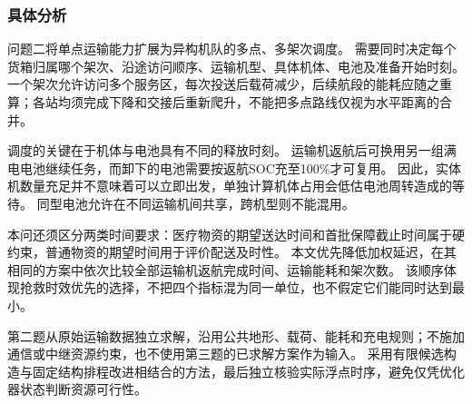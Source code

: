\subsubsection{具体分析}
\label{sec:q2:analysis}

问题二将单点运输能力扩展为异构机队的多点、多架次调度。
需要同时决定每个货箱归属哪个架次、沿途访问顺序、运输机型、具体机体、电池及准备开始时刻。
一个架次允许访问多个服务区，每次投送后载荷减少，后续航段的能耗应随之重算；各站均须完成下降和交接后重新爬升，不能把多点路线仅视为水平距离的合并。

调度的关键在于机体与电池具有不同的释放时刻。
运输机返航后可换用另一组满电电池继续任务，而卸下的电池需要按返航SOC充至100\%才可复用。
因此，实体机数量充足并不意味着可以立即出发，单独计算机体占用会低估电池周转造成的等待。
同型电池允许在不同运输机间共享，跨机型则不能混用。

本问还须区分两类时间要求：医疗物资的期望送达时间和首批保障截止时间属于硬约束，普通物资的期望时间用于评价配送及时性。
本文优先降低加权延迟，在其相同的方案中依次比较全部运输机返航完成时间、运输能耗和架次数。
该顺序体现抢救时效优先的选择，不把四个指标混为同一单位，也不假定它们能同时达到最小。

第二题从原始运输数据独立求解，沿用公共地形、载荷、能耗和充电规则；不施加通信或中继资源约束，也不使用第三题的已求解方案作为输入。
采用有限候选构造与固定结构排程改进相结合的方法，最后独立核验实际浮点时序，避免仅凭优化器状态判断资源可行性。
